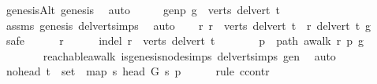 \begin{isabellebody}
\ genesisAlt\ genesis\ \isamarkupfalse%
\ auto\isanewline
\ \ \isamarkupfalse%
\ \isamarkupfalse%
\ genp{\isacharcolon}{\kern0pt}\ {\isachardoublequoteopen}g\ {\isasymin}\ verts\ {\isacharparenleft}{\kern0pt}del{\isacharunderscore}{\kern0pt}vert\ t{\isacharparenright}{\kern0pt}{\isachardoublequoteclose}\isanewline
\ \ \ \ \isamarkupfalse%
\ assms{\isacharparenleft}{\kern0pt}{}{\isacharparenright}{\kern0pt}\ genesis\ del{\isacharunderscore}{\kern0pt}vert{\isacharunderscore}{\kern0pt}simps\ \isamarkupfalse%
\ auto\isanewline
\ \ \isamarkupfalse%
\ {\isachardoublequoteopen}{\isacharparenleft}{\kern0pt}{\isasymforall}r{\isachardot}{\kern0pt}\ r\ {\isasymin}\ verts\ {\isacharparenleft}{\kern0pt}del{\isacharunderscore}{\kern0pt}vert\ t{\isacharparenright}{\kern0pt}\ {\isasymlongrightarrow}\ r\ {\isasymrightarrow}\isactrlsup {\isacharasterisk}{\kern0pt}\isactrlbsub del{\isacharunderscore}{\kern0pt}vert\ t\isactrlesub \ g{\isacharparenright}{\kern0pt}{\isachardoublequoteclose}\ \isanewline
\ \ \isamarkupfalse%
\ safe\isanewline
\ \ \ \ \isamarkupfalse%
\ r\isanewline
\ \ \ \ \isamarkupfalse%
\ in{\isacharunderscore}{\kern0pt}del{\isacharcolon}{\kern0pt}\ {\isachardoublequoteopen}r\ {\isasymin}\ verts\ {\isacharparenleft}{\kern0pt}del{\isacharunderscore}{\kern0pt}vert\ t{\isacharparenright}{\kern0pt}{\isachardoublequoteclose}\isanewline
\ \ \ \ \isamarkupfalse%
\ \isamarkupfalse%
\ p\ \ path{\isacharcolon}{\kern0pt}\ {\isachardoublequoteopen}awalk\ r\ p\ g{\isachardoublequoteclose}\ \isanewline
\ \ \ \ \ \ \isamarkupfalse%
\ reachable{\isacharunderscore}{\kern0pt}awalk\ is{\isacharunderscore}{\kern0pt}genesis{\isacharunderscore}{\kern0pt}node{\isachardot}{\kern0pt}simps\ del{\isacharunderscore}{\kern0pt}vert{\isacharunderscore}{\kern0pt}simps\ gen\ \isamarkupfalse%
\ auto\isanewline
\ \ \ \ \isamarkupfalse%
\ no{\isacharunderscore}{\kern0pt}head{\isacharcolon}{\kern0pt}\ {\isachardoublequoteopen}t\ {\isasymnotin}\ {\isacharparenleft}{\kern0pt}set\ {\isacharparenleft}{\kern0pt}\ map\ {\isacharparenleft}{\kern0pt}{\isasymlambda}s{\isachardot}{\kern0pt}\ {\isacharparenleft}{\kern0pt}head\ G\ s{\isacharparenright}{\kern0pt}{\isacharparenright}{\kern0pt}\ p{\isacharparenright}{\kern0pt}{\isacharparenright}{\kern0pt}{\isachardoublequoteclose}\isanewline
\ \ \ \ \isamarkupfalse%
\ {\isacharparenleft}{\kern0pt}rule\ ccontr{\isacharparenright}{\kern0pt}\isanewline

\end{isabellebody}
